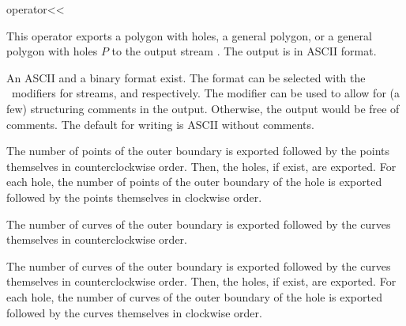
\ccHtmlNoClassLinks
\begin{ccRefFunction}{operator<<}
\label{refPolygon_with_holes_operator_leftshift}

\ccDefinition

This operator exports a polygon with holes, a general polygon, or a general 
polygon with holes $P$ to the output stream . The output is in ASCII
format.

An ASCII and a binary format exist. The format can be selected with
the \cgal\ modifiers for streams,  and
 respectively. The modifier 
can be used to allow for (a few) structuring comments in the
output. Otherwise, the output would be free of comments.  The default
for writing is ASCII without comments.


The number of points of the outer boundary is exported followed by the 
points themselves in counterclockwise order. Then, the holes, if exist, are
exported. For each hole, the number of points of the outer boundary of the 
hole is exported followed by the points themselves in clockwise order.

The number of curves of the outer boundary is exported followed by the 
curves themselves in counterclockwise order.


The number of curves of the outer boundary is exported followed by the 
curves themselves in counterclockwise order. Then, the holes, if exist, are
exported. For each hole, the number of curves of the outer boundary of the 
hole is exported followed by the curves themselves in clockwise order.

\ccSeeAlso

\\ 
\\ 
\\ 

\end{ccRefFunction}
